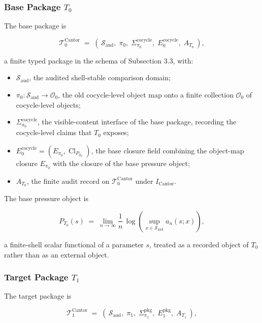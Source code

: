 \documentclass[11pt]{article}
\providecommand{\tightlist}{}
\theoremstyle{definition}
\begin{document}
\subsubsection{\texorpdfstring{Base Package \(T_0\)}{Base Package T\_0}}

The base package is

\[
\mathcal T_0^{\mathrm{Cantor}}\;=\;(\,\mathcal S_{\mathrm{aud}},\;\pi_0,\;\Sigma_{\pi_0}^{\mathrm{cocycle}},\;E_0^{\mathrm{cocycle}},\;A_{T_0}\,),
\]

a finite typed package in the schema of Subsection 3.3, with:

\begin{itemize}
\tightlist
\item
  \(\mathcal S_{\mathrm{aud}}\), the audited shell-stable comparison domain;
\item
  \(\pi_0:\mathcal S_{\mathrm{aud}}\to\mathcal O_0\), the old cocycle-level object map onto a finite collection \(\mathcal O_0\) of cocycle-level objects;
\item
  \(\Sigma_{\pi_0}^{\mathrm{cocycle}}\), the visible-content interface of the base package, recording the cocycle-level claims that \(T_0\) exposes;
\item
  \(E_0^{\mathrm{cocycle}}=(E_{\pi_0},\operatorname{Cl}_{P_{T_0}})\), the base closure field combining the object-map closure \(E_{\pi_0}\) with the closure of the base pressure object;
\item
  \(A_{T_0}\), the finite audit record on \(\mathcal T_0^{\mathrm{Cantor}}\) under \(I_{\mathrm{Cantor}}\).
\end{itemize}

The base pressure object is

\[
P_{T_0}(s)\;=\;\lim_{n\to\infty}\frac{1}{n}\,\log\!\left(\sup_{x\in\mathcal S_{\mathrm{aud}}}a_n(s;x)\right),
\]

a finite-shell scalar functional of a parameter \(s\), treated as a recorded object of \(T_0\) rather than as an external object.

\subsubsection{\texorpdfstring{Target Package \(T_1\)}{Target Package T\_1}}

The target package is

\[
\mathcal T_1^{\mathrm{Cantor}}\;=\;(\,\mathcal S_{\mathrm{aud}},\;\pi_1,\;\Sigma_{\pi_1}^{\mathrm{pkg}},\;E_1^{\mathrm{pkg}},\;A_{T_1}\,),
\]
\end{document}
